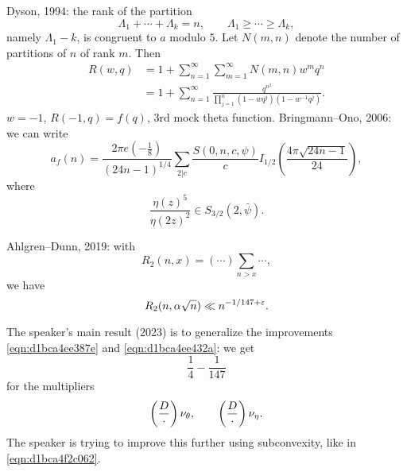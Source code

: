 \documentclass[reqno]{amsart} 
\begin{document}
\begin{enumerate}
  Dyson, 1994: the rank of the partition
  \begin{equation*}
    \Lambda_1 + \dotsb + \Lambda_k = n,
    \qquad
    \Lambda_1 \geq \dotsb \geq \Lambda_k,
  \end{equation*}
  namely $\Lambda_1 - k$, is congruent to $a$ modulo $5$.  Let $N (m, n)$ denote the number of partitions of $n$ of rank $m$.  Then
  \begin{align*}
    R (w, q) &= 1 + \sum_{n = 1}^\infty \sum_{m = 1}^\infty N (m, n) w^m q^n \\
             &=
               1 + \sum_{n = 1}^\infty
               \frac{q^{n^2 }}{\prod_{j = 1 }^n
               (1 - w q^j ) (1 - w^{-1} q^j )
               }.
  \end{align*}
  $w = - 1$, $R(-1,q) = f(q)$, $3$rd mock theta function.  Bringmann--Ono, 2006: we can write
  \begin{equation*}
    a_f (n) = \frac{2 \pi e (- \tfrac{1}{8})}{(2 4n - 1  )^{1/4} }
    \sum_{2 | c}
    \frac{S (0, n, c, \psi )}{c}
    I_{1/2} \left( \frac{4 \pi \sqrt{2 4 n - 1}}{24} \right),
  \end{equation*}
  where
  \begin{equation*}
    \frac{\eta (z)^5 }{ \eta (2 z )^2 }
    \in S_{3/2 } (2, \bar{\psi }).
  \end{equation*}

  Ahlgren--Dunn, 2019: with
  \begin{equation*}
    R_2(n,x) = (\dotsb) \sum_{n > x} \dotsb,
  \end{equation*}
  we have
  \begin{equation*}
    R_2 (n, \alpha \sqrt{n}) \ll n^{- 1 / 147 + \varepsilon}.
  \end{equation*}
\end{enumerate}
The speaker's main result (2023) is to generalize the improvements \eqref{eqn:d1bca4ee387e} and \eqref{eqn:d1bca4ee432a}: we get
\begin{equation*}
\frac{1}{4} - \frac{1}{147}
\end{equation*}
for the multipliers
\begin{equation*}
\left( \frac{D}{\cdot } \right) \nu_\theta, \qquad \left( \frac{D}{\cdot } \right)  \nu_\eta.
\end{equation*}
The speaker is trying to improve this further using subconvexity, like in \eqref{eqn:d1bca4f2c062}.
\end{document}
